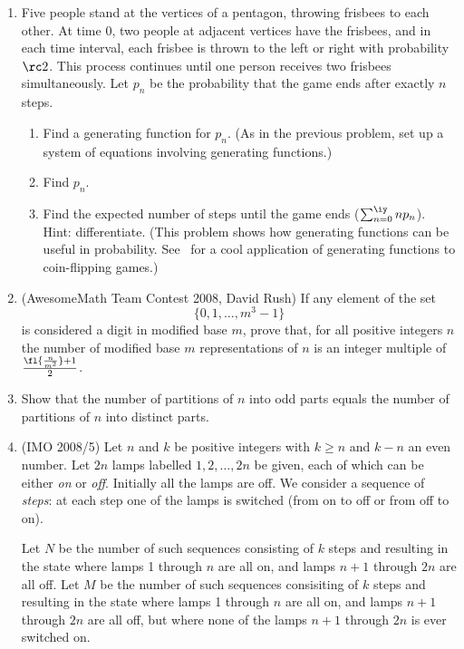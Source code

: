 \begin{enumerate}
\item Five people stand at the vertices of a pentagon, throwing frisbees to each other. At time 0, two people at adjacent vertices have the frisbees, and in each time interval, each frisbee is thrown to the left or right with probability $\rc2$. This process continues until one person receives two frisbees simultaneously. Let $p_n$ be the probability that the game ends after exactly $n$ steps.
\begin{enumerate}
\item
Find a generating function for $p_n$. (As in the previous problem, set up a system of equations involving generating functions.)
\item
Find $p_n$.
\item
Find the expected number of steps until the game ends ($\sum_{n=0}^{\iy} np_n$). Hint: differentiate. (This problem shows how generating functions can be useful in probability. See~\cite[\S 8.4]{gkp} for a cool application of generating functions to coin-flipping games.)
\end{enumerate}

\item (AwesomeMath Team Contest 2008, David Rush) If any element of the set \[\{0,1,\ldots, m^3-1\}\] is considered a digit in modified base $m$, prove that, for all positive integers $n$ the number of modified base $m$ representations of $n$ is an integer multiple of $\frac{\fl{\frac{n}{m^2}}+1}{2}$.

\item Show that the number of partitions of $n$ into odd parts equals the number of partitions of $n$ into distinct parts.

\item (IMO 2008/5) Let $n$ and $k$ be positive integers with $k\ge n$ and $k-n$ an even number. Let $2n$ lamps labelled $1,2,\ldots, 2n$ be given, each of which can be either {\it on} or {\it off}. Initially all the lamps are off. We consider a sequence of {\it steps}: at each step one of the lamps is switched (from on to off or from off to on).

Let $N$ be the number of such sequences consisting of $k$ steps and resulting in the state where lamps 1 through $n$ are all on, and lamps $n+1$ through $2n$ are all off.  Let $M$ be the number of such sequences consisiting of $k$ steps and resulting in the state where lamps 1 through $n$ are all on, and lamps $n+1$ through $2n$ are all off, but where none of the lamps $n+1$ through $2n$ is ever switched on.


\end{enumerate}
